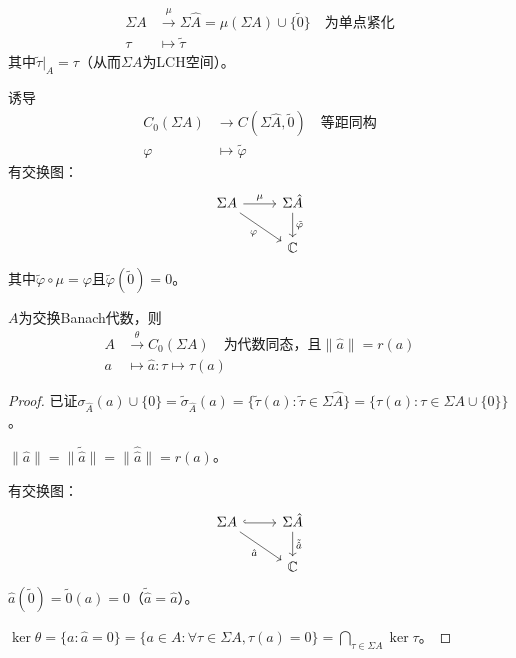 \documentclass[lang=cn,a4paper,newtx,section]{elegantbook}
\begin{document}
\begin{proposition}
  \begin{equation*}
    \begin{aligned}
      \Sigma A &\xrightarrow{\mu} \Sigma\hat{A} = \mu(\Sigma A) \cup \{\tilde{0}\} \quad \text{为单点紧化} \\
      \tau &\longmapsto \tilde{\tau}
    \end{aligned}
  \end{equation*}
  其中$\tilde{\tau}|_A = \tau$（从而$\Sigma A$为LCH空间）。
  
  诱导
  \begin{equation*}
    \begin{aligned}
      C_0(\Sigma A) &\longrightarrow C(\Sigma\hat{A}, \tilde{0}) \quad \text{等距同构} \\
      \varphi &\longmapsto \tilde{\varphi}
    \end{aligned}
  \end{equation*}
  有交换图：
  \begin{equation*}
    \begin{tikzcd}
      \Sigma A \arrow[r, "\mu"] \arrow[rd, "\varphi"'] & \Sigma\hat{A} \arrow[d, "\tilde{\varphi}"] \\
      & \mathbb{C}
    \end{tikzcd}
  \end{equation*}
  其中$\tilde{\varphi} \circ \mu = \varphi$且$\tilde{\varphi}(\tilde{0}) = 0$。
\end{proposition}

\begin{theorem}[Gelfand]
  $A$为交换Banach代数，则
  \begin{equation*}
    \begin{aligned}
      A &\xrightarrow{\theta} C_0(\Sigma A) \quad \text{为代数同态，且}\|\hat{a}\| = r(a) \\
      a &\longmapsto \hat{a}: \tau \longmapsto \tau(a)
    \end{aligned}
  \end{equation*}
\end{theorem}

\begin{proof}
  已证$\sigma_{\hat{A}}(a) \cup \{0\} = \tilde{\sigma}_{\hat{A}}(a) = \{\tilde{\tau}(a) : \tilde{\tau} \in \Sigma\hat{A}\} = \{\tau(a) : \tau \in \Sigma A \cup \{0\}\}$。
  
  $\|\hat{a}\| = \|\tilde{\hat{a}}\| = \|\hat{\hat{a}}\| = r(a)$。
  
  有交换图：
  \begin{equation*}
    \begin{tikzcd}
      \Sigma A \arrow[r, hook] \arrow[rd, "\hat{a}"'] & \Sigma\hat{A} \arrow[d, "\tilde{\hat{a}}"] \\
      & \mathbb{C}
    \end{tikzcd}
  \end{equation*}
  $\hat{a}(\tilde{0}) = \tilde{0}(a) = 0$（$\tilde{\hat{a}} = \hat{a}$）。
  
  $\ker\theta = \{a : \hat{a} = 0\} = \{a \in A : \forall \tau \in \Sigma A, \tau(a) = 0\} = \bigcap_{\tau \in \Sigma A}\ker\tau$。
\end{proof}
\end{document}
